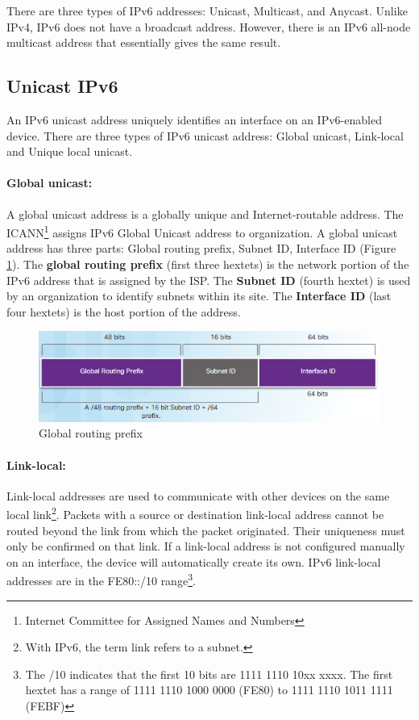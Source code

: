 There are three types of IPv6 addresses: Unicast, Multicast, and Anycast. Unlike IPv4, IPv6 does not have a broadcast address. However, there is an IPv6 all-node multicast address that essentially gives the same result.

\subsection{Unicast IPv6}

An IPv6 unicast address uniquely identifies an interface on an IPv6-enabled device. There are three types of IPv6 unicast address: Global unicast, Link-local and Unique local unicast.

\paragraph{Global unicast:} A global unicast address  is a globally unique and Internet-routable address. The ICANN\footnote{Internet Committee for Assigned Names and Numbers} assigns IPv6 Global Unicast address to organization. A global unicast address has three parts: Global routing prefix, Subnet ID, Interface ID (Figure \ref{GUA}). The \textbf{global routing prefix} (first three hextets) is the network portion of the IPv6 address that is assigned by the ISP. The \textbf{Subnet ID} (fourth hextet) is used by an organization to identify subnets within its site. The \textbf{Interface ID} (last four hextets) is the host portion of the address.

\begin{figure}[hbtp]
\caption{Global routing prefix}\label{GUA}
\centering
\includegraphics[scale=0.6]{pictures/GUA.PNG}
\end{figure}


\paragraph{Link-local:} Link-local addresses are used to communicate with other devices on the same local link\footnote{With IPv6, the term link refers to a subnet.}. Packets with a source or destination link-local address cannot be routed beyond the link from which the packet originated. Their uniqueness must only be confirmed on that link. If a link-local address is not configured manually on an interface, the device will automatically create its own. IPv6 link-local addresses are in the FE80::/10 range\footnote{The /10 indicates that the first 10 bits are 1111 1110 10xx xxxx. The first hextet has a range of 1111 1110 1000 0000 (FE80) to 1111 1110 1011 1111 (FEBF)}.

